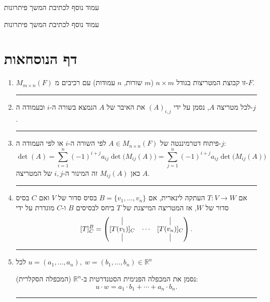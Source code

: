 \documentclass[12pt, a4paper]{article}
\begin{document}
    \pagebreak 
    
    עמוד נוסף לכתיבת המשך פיתרונות
    
    \pagebreak
    עמוד נוסף לכתיבת המשך פיתרונות

 \pagebreak


\section*{דף הנוסחאות}

\begin{enumerate}
\item $M_{m\times n}(F)$ זו קבוצת המטריצות בגודל $n\times m$
($m$ שורות, $n$ עמודות)
עם רכיבים מ-$F$.

\noindent\rule{\textwidth-30pt}{0.4pt}

\item לכל מטריצה $A$, נסמן על ידי $(A)_{i,j}$ את האיבר של $A$ הנמצא בשורה ה-$i$ ובעמודה ה-$j$.

\noindent\rule{\textwidth-30pt}{0.4pt}

\item פיתוח דטרמיננטה של $A\in M_{n\times n}(F)$ לפי השורה ה-$i$ או לפי העמודה ה-$j$:
\[
\det(A)=\sum_{i=1}^{n}(-1)^{i+j}a_{ij}\det\!\big(M_{ij}(A)\big)
=\sum_{j=1}^{n}(-1)^{i+j}a_{ij}\det\!\big(M_{ij}(A)\big)
\]
כאן $M_{ij}(A)$ זה המינור ה-$i,j$ של המטריצה $A$.

\noindent\rule{\textwidth-30pt}{0.4pt}

\item אם $T:V\to W$ העתקה לינארית, אם $B=\{v_1,\ldots,v_n\}$ בסיס סדור של $V$ ואם $C$ בסיס סדור של $W$,
אז המטריצה המייצגת של $T$ ביחס לבסיסים $B$ ו-$C$ מוגדרת על ידי
\[
[T]^B_C=
\begin{pmatrix}
\vline & & \vline\\
[T(v_1)]_C & \cdots & [T(v_n)]_C\\
\vline & & \vline
\end{pmatrix}.
\]

\noindent\rule{\textwidth-30pt}{0.4pt}

\item לכל $u=(a_1,\ldots,a_n),\; w=(b_1,\ldots,b_n)\in\mathbb{R}^n$

נסמן את המכפלה הפנימית הסטנדרטית ב-$\mathbb{R}^n$ (המכפלה הסקלרית):
\[
 u\cdot w=a_1\cdot b_1+\cdots+a_n\cdot b_n.
\]

\noindent\rule{\textwidth-30pt}{0.4pt}




\end{enumerate}
\end{document}
